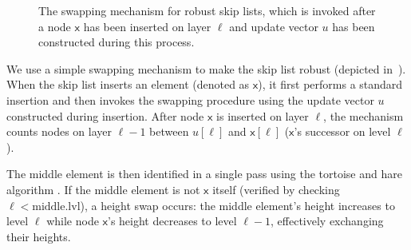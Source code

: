\begin{figure}[thp]
    \centering
    \begin{pchstack}[boxed,center,space=0.5em]
    \end{pchstack}
  \caption[Skip List Swapping Mechanism.]{The swapping mechanism for robust skip lists, which is invoked after a node $\mathsf{x}$  has been inserted on layer $\ell$ and update vector $u$ has been constructed during this process. 
  } 
  \label{fig:swap}
\end{figure}

We use a simple swapping mechanism to make the skip list robust (depicted in~). When the skip list inserts an element (denoted as $\mathsf{x}$), it first performs a standard insertion and then invokes the swapping procedure using the update vector $u$ constructed during insertion. After node $\mathsf{x}$ is inserted on layer $\ell$, the mechanism counts nodes on layer $\ell-1$ between $u[\ell]$ and $\mathsf{x}[\ell]$ ($\mathsf{x}$'s successor on level $\ell$). 

The middle element is then identified in a single pass using the tortoise and hare algorithm \cite{knuth1971art}. If the middle element is not $\mathsf{x}$ itself (verified by checking $\ell < \text{middle.lvl}$), a height swap occurs: the middle element's height increases to level $\ell$ while node $\mathsf{x}$'s height decreases to level $\ell-1$, effectively exchanging their heights.

